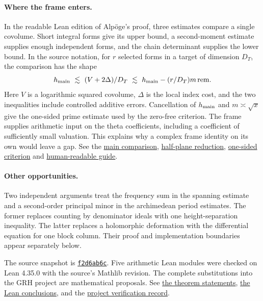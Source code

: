 \documentclass[11pt,letterpaper]{article}
\newcommand{\baseurl}{https://github.com/VladimirReshetnikov/ProveIt/blob/f2d6ab6c4b70ea73b2deac9e33ad966bc92ea36f/Analysis/GeneralizedRiemannHypothesis/}
\newcommand{\source}[3]{\href{\baseurl Lean/grh/src/#1.lean\#L#2}{#3}}
\begin{document}
\paragraph{Where the frame enters.}
In the readable Lean edition of Alp\"oge's proof, three estimates compare a single covolume. Short integral forms give its upper bound, a second-moment estimate supplies enough independent forms, and the chain determinant supplies the lower bound. In the source notation, for $r$ selected forms in a target of dimension $D_T$, the comparison has the shape
\[
 h_{\rm main}\ \lesssim\ (V+2\Delta)/D_T\ \lesssim\
 h_{\rm main}-(r/D_T)m\,\mathrm{rem}.
\]
Here $V$ is a logarithmic squared covolume, $\Delta$ is the local index cost, and the two inequalities include controlled additive errors. Cancellation of $h_{\rm main}$ and $m\asymp\sqrt{x}$ give the one-sided prime estimate used by the zero-free criterion. The frame supplies arithmetic input on the theta coefficients, including a coefficient of sufficiently small valuation. This explains why a complex frame identity on its own would leave a gap. See the \source{New/Reduction/MainInequality}{1}{main comparison}, \source{New/Reduction/OneSidedBound}{1}{half-plane reduction}, \source{New/Reduction/Zeros/Criterion}{27}{one-sided criterion} and \href{\baseurl docs/guide/theta_lifts_and_dirichlet_zeros.tex}{human-readable guide}.

\paragraph{Other opportunities.}
Two independent arguments treat the frequency sum in the spanning estimate and a second-order principal minor in the archimedean period estimates. The former replaces counting by denominator ideals with one height-separation inequality. The latter replaces a holomorphic deformation with the differential equation for one block column. Their proof and implementation boundaries appear separately below.

\vfill
{\small The source snapshot is \href{https://github.com/VladimirReshetnikov/ProveIt/commit/f2d6ab6c4b70ea73b2deac9e33ad966bc92ea36f}{\texttt{f2d6ab6c}}. Five arithmetic Lean modules were checked on Lean 4.35.0 with the source's Mathlib revision. The complete substitutions into the GRH project are mathematical proposals. See \source{Statements}{1}{the theorem statements}, \source{Main}{1}{the Lean conclusions}, and the \href{\baseurl Lean/grh/README.md}{project verification record}.}
\newpage
\end{document}
